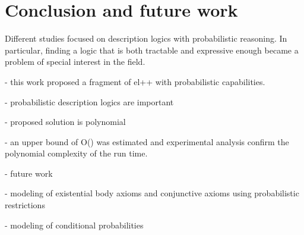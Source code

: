 
\chapter{Conclusion and future work}
\label{cap:conclusion}

Different studies focused on description logics with probabilistic reasoning. In particular, finding a logic that is both tractable and expressive enough became a problem of special interest in the field.

- this work proposed a fragment of el++ with probabilistic capabilities.

- probabilistic description logics are important

- proposed solution is polynomial

- an upper bound of O() was estimated and experimental analysis confirm the polynomial complexity of the run time. 

- future work

- modeling of existential body axioms and conjunctive axioms using probabilistic restrictions

- modeling of conditional probabilities

